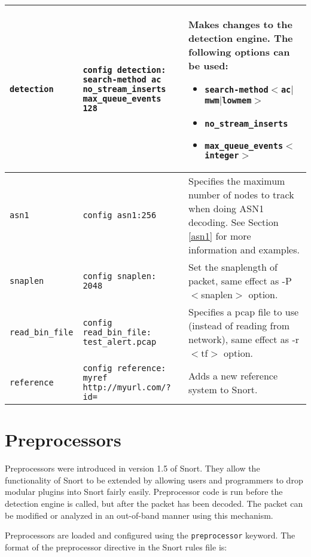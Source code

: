 \documentclass[english]{report}
\begin{document}
\begin{center}
\begin{longtable}{| p{2in} | p{2.25in} | p{2.25in} |}
\hline
\texttt{detection} & \texttt{config detection: search-method ac no\_stream\_inserts max\_queue\_events 128} & Makes changes to the detection engine. 
The following options can be used:\begin{itemize}\item \texttt{search-method$<$ac$|$mwm$|$lowmem$>$}
\item \texttt{no\_stream\_inserts}
\item \texttt{max\_queue\_events$<$integer$>$}\end{itemize}\\
\hline
\texttt{asn1} & \texttt{config asn1:256} & Specifies the maximum number of nodes to 
track when doing ASN1 decoding. See Section \ref{asn1} for more information and examples.\\
\hline
\texttt{snaplen} & \texttt{config snaplen: 2048} & Set the snaplength of packet, same effect as 
-P $<$snaplen$>$ option.\\
\hline
\texttt{read\_bin\_file} & \texttt{config read\_bin\_file: test\_alert.pcap} & Specifies a pcap file to use 
(instead of reading from network),
        same effect as -r $<$tf$>$ option.\\
\hline
\texttt{reference} & \texttt{config reference: myref http://myurl.com/?id=} & Adds a new reference system to Snort.  \\
\hline
\end{longtable}
\end{center}

\newpage
\section{Preprocessors}

Preprocessors were introduced in version 1.5 of Snort. They allow
the functionality of Snort to be extended by allowing users and programmers
to drop modular plugins into Snort fairly easily.
Preprocessor code is run before the detection engine is called, but
after the packet has been decoded. The packet can be modified or analyzed
in an out-of-band manner using this mechanism.

Preprocessors are loaded and configured using the {\tt preprocessor} keyword.
The format of the preprocessor directive in the Snort rules file is:
\end{document}
